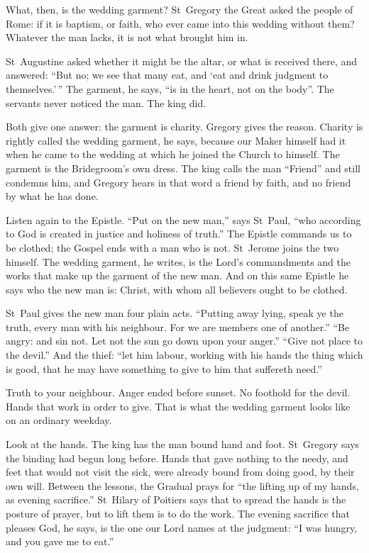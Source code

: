 \bigskip

What, then, is the wedding garment? St~Gregory the Great asked the people of
Rome: if it is baptism, or faith, who ever came into this wedding without them?
Whatever the man lacks, it is not what brought him in.

St~Augustine asked whether it might be the altar, or what is received there,
and answered: ``But no; we see that many eat, and `eat and drink judgment to
themselves.'\,'' The garment, he says, ``is in the heart, not on the body''.
The servants never noticed the man. The king did.

Both give one answer: the garment is charity. Gregory gives the reason. Charity
is rightly called the wedding garment, he says, because our Maker himself had
it when he came to the wedding at which he joined the Church to himself. The
garment is the Bridegroom's own dress. The king calls the man ``Friend'' and
still condemns him, and Gregory hears in that word a friend by faith, and no
friend by what he has done.

\bigskip

Listen again to the Epistle. ``Put on the new man,'' says St~Paul, ``who
according to God is created in justice and holiness of truth.'' The Epistle
commands us to be clothed; the Gospel ends with a man who is not. St~Jerome
joins the two himself. The wedding garment, he writes, is the Lord's
commandments and the works that make up the garment of the new man. And on this
same Epistle he says who the new man is: Christ, with whom all believers ought
to be clothed.

St~Paul gives the new man four plain acts. ``Putting away lying, speak ye the
truth, every man with his neighbour. For we are members one of another.'' ``Be
angry: and sin not. Let not the sun go down upon your anger.'' ``Give not place
to the devil.'' And the thief: ``let him labour, working with his hands the
thing which is good, that he may have something to give to him that suffereth
need.''

Truth to your neighbour. Anger ended before sunset. No foothold for the devil.
Hands that work in order to give. That is what the wedding garment looks like
on an ordinary weekday.

Look at the hands. The king has the man bound hand and foot. St~Gregory says
the binding had begun long before. Hands that gave nothing to the needy, and
feet that would not visit the sick, were already bound from doing good, by
their own will. Between the lessons, the Gradual prays for ``the lifting up of
my hands, as evening sacrifice.'' St~Hilary of Poitiers says that to spread the
hands is the posture of prayer, but to lift them is to do the work. The evening
sacrifice that pleases God, he says, is the one our Lord names at the judgment:
``I was hungry, and you gave me to eat.''

